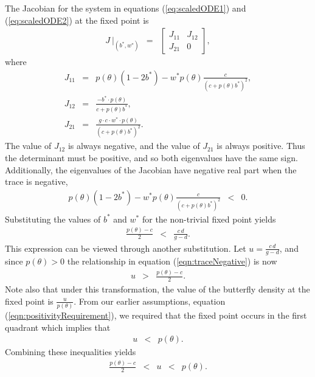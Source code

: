 \documentclass[review,authoryear]{elsarticle}
\begin{document}
The Jacobian for the system in equations (\ref{eq:scaledODE1}) and
(\ref{eq:scaledODE2}) at the fixed point is
\begin{eqnarray}
  J ~ \bigg|_{(b^*,w^*)} & = &
          \left[
          \begin{array}{rr}
            J_{11} & J_{12} \\
            J_{21} & 0
          \end{array}
          \right],
\end{eqnarray}
where
\begin{eqnarray}
  \label{eq:jacobian}
  J_{11} & = & p(\theta)(1-2b^*) - w^* p(\theta)\frac{c}{(c+p(\theta)b^*)^2}, \\
  J_{12} & = & \frac{-b^*\cdot p(\theta)}{c+p(\theta)b^*}, \\
  J_{21} & = & \frac{g\cdot c \cdot w^* \cdot p(\theta)}{(c+p(\theta)b^*)^2}.
\end{eqnarray}
The value of $J_{12}$ is always negative, and the value of $J_{21}$ is always positive. Thus the determinant must be positive, and so both eigenvalues have the same sign.
Additionally, the eigenvalues of the Jacobian have negative real part when the
trace is negative,
\begin{eqnarray}
  p(\theta)(1-2b^*) - w^* p(\theta)\frac{c}{(c+p(\theta)b^*)^2} & < & 0.
\end{eqnarray}
Substituting the values of $b^*$ and $w^*$ for the non-trivial fixed point
yields
\begin{eqnarray}
  \label{eqn:traceNegative}
  \frac{p(\theta)-c}{2} & < & \frac{c\,d}{g-d}.
\end{eqnarray}
This expression can be viewed through another substitution. Let
$u=\frac{c\,d}{g-d}$, and since
$p(\theta)>0$ the relationship in equation
(\ref{eqn:traceNegative}) is now
\begin{eqnarray}
  \label{eq:stabilityParameters}
  u & > & \frac{p(\theta)-c}{2}.
\end{eqnarray}
Note also that under this transformation, the value of the butterfly
density at the fixed point is $\frac{u}{p(\theta)}$. From our earlier assumptions, equation (\ref{eqn:positivityRequirement}), we required that the fixed point occurs in the first quadrant which implies that
\begin{eqnarray}
  \label{eq:boundFixedPoint}
  u & < & p(\theta).
\end{eqnarray}
Combining these inequalities yields
\begin{equation}
  \begin{array}{rcccl}
  \frac{p(\theta)-c}{2}  & <  & u  & < & p(\theta).
  \end{array}
\end{equation}
\end{document}
